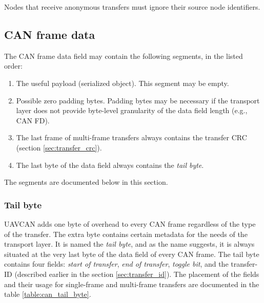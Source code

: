 Nodes that receive anonymous transfers must ignore their source node identifiers.

\subsection{CAN frame data}

The CAN frame data field may contain the following segments, in the listed order:
\begin{samepage}
\begin{enumerate}
    \item The useful payload (serialized object). This segment may be empty.
    \item Possible zero padding bytes.
          Padding bytes may be necessary if the transport layer does not provide byte-level
          granularity of the data field length (e.g., CAN FD).
    \item The last frame of multi-frame transfers always contains the transfer CRC (section \ref{sec:transfer_crc}).
    \item The last byte of the data field always contains the \emph{tail byte}.
\end{enumerate}
\end{samepage}
The segments are documented below in this section.

\subsubsection{Tail byte}

UAVCAN adds one byte of overhead to every CAN frame regardless of the type of the transfer.
The extra byte contains certain metadata for the needs of the transport layer.
It is named the \emph{tail byte}, and as the name suggests, it is always situated
at the very last byte of the data field of every CAN frame.
The tail byte contains four fields: \emph{start of transfer}, \emph{end of transfer},
\emph{toggle bit}, and the transfer-ID (described earlier in the section \ref{sec:transfer_id}).
The placement of the fields and their usage for single-frame and multi-frame transfers
are documented in the table \ref{table:can_tail_byte}.

